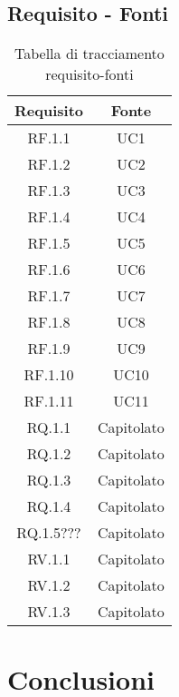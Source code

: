 \subsection{Requisito - Fonti}
\begin{table}[H]
  \centering
  \begin{tabular}{|c|c|}
    \hline
    \rowcolor[HTML]{036400}
    {\color[HTML]{FFFFFF} Requisito} & {\color[HTML]{FFFFFF} Fonte} \\ \hline
    \rowcolor[HTML]{EFEFEF}
    RF.1.1 & UC1 \\ \hline
    \rowcolor[HTML]{C0C0C0}
    RF.1.2 & UC2 \\ \hline
    \rowcolor[HTML]{EFEFEF}
    RF.1.3 & UC3 \\ \hline
    \rowcolor[HTML]{C0C0C0}
    RF.1.4 & UC4 \\ \hline
    \rowcolor[HTML]{EFEFEF}
    RF.1.5 & UC5 \\ \hline
    \rowcolor[HTML]{C0C0C0}
    RF.1.6 & UC6 \\ \hline
    \rowcolor[HTML]{EFEFEF}
    RF.1.7 & UC7 \\ \hline
    \rowcolor[HTML]{C0C0C0}
    RF.1.8 & UC8 \\ \hline
    \rowcolor[HTML]{EFEFEF}
    RF.1.9 & UC9 \\ \hline
    \rowcolor[HTML]{C0C0C0}
    RF.1.10 & UC10 \\ \hline
    \rowcolor[HTML]{EFEFEF}
    RF.1.11 & UC11 \\ \hline
    \rowcolor[HTML]{C0C0C0}
    RQ.1.1 & Capitolato \\ \hline
    \rowcolor[HTML]{EFEFEF}
    RQ.1.2 & Capitolato \\ \hline
    \rowcolor[HTML]{C0C0C0}
    RQ.1.3 & Capitolato \\ \hline
    \rowcolor[HTML]{EFEFEF}
    RQ.1.4 & Capitolato \\ \hline
    \rowcolor[HTML]{C0C0C0}
    RQ.1.5??? & Capitolato \\ \hline
    \rowcolor[HTML]{EFEFEF}
    RV.1.1 & Capitolato \\ \hline
    \rowcolor[HTML]{C0C0C0}
    RV.1.2 & Capitolato \\ \hline
    \rowcolor[HTML]{EFEFEF}
    RV.1.3 & Capitolato \\ \hline
  \end{tabular}
  \caption{Tabella di tracciamento requisito-fonti}
\end{table}

\section{Conclusioni}
